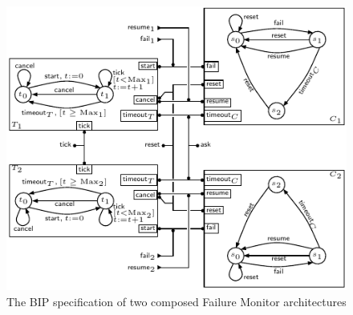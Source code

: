 \documentclass[smallcondensed]{svjour3}
\begin{document}
\begin{figure}[ht]
  \centering
  \includegraphics[width=0.9\columnwidth]{ActaXFIG/BIPspec-DoubleArchFailureTimer-v2-2}
  \caption{The BIP specification of two composed Failure Monitor architectures}
  \label{schema:ArchFailure:BIP:Double}
\end{figure}
\end{document}
